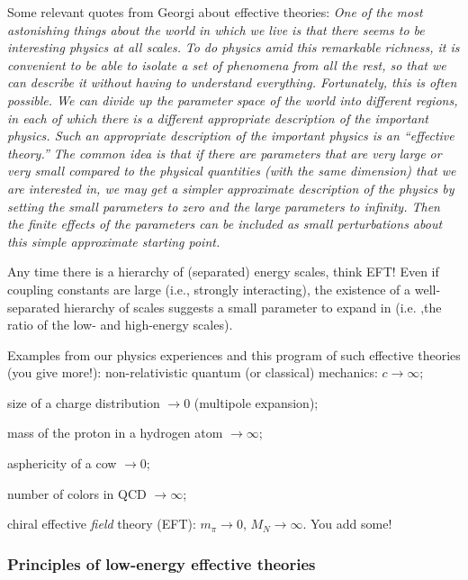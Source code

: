 Some relevant quotes from Georgi about effective theories: 
 \bi
 \I \emph{
  {\re One of the most astonishing things about the world in which we live is that there seems to be interesting physics at all scales.}}
  \I \emph{
  To do physics amid this remarkable richness, it is convenient to be able to isolate a set of phenomena from all the rest, so that we can describe it without having to understand everything.
  Fortunately, this is often possible. We can divide up the parameter space of the world into different regions, in each of which there is a different appropriate description of the important physics. {\re Such an appropriate
  description of the important physics is an ``effective theory.''}}
  \I \emph{
  The common idea is that if there are parameters that are very large or very small compared to the physical quantities (with the same dimension) that we are interested in, 
  {\re we may get a simpler approximate description of the physics by setting the small parameters to zero and the large parameters to infinity.} Then the finite effects of the parameters can be included as small perturbations about this simple approximate starting point.}  
 \ei

Any time there is a hierarchy of (separated) energy scales, think EFT!   Even if coupling constants are large (i.e., strongly interacting), the existence of a well-separated hierarchy of scales suggests a small parameter to expand in (i.e. ,the ratio of the low- and high-energy scales).


Examples from our physics experiences and this program of such effective theories (you give more!):
  \bi
 \I non-relativistic quantum (or classical) mechanics: $c\rightarrow \infty$;

 \I size of a charge distribution $\rightarrow 0$ (multipole expansion);

 \I mass of the proton in a hydrogen atom $\rightarrow \infty$;

 \I asphericity of a cow $\rightarrow 0$;

 \I number of colors in QCD $\rightarrow\infty$;

 \I  chiral effective \emph{field} theory (EFT): $m_\pi \rightarrow 0$, $M_N \rightarrow \infty$.
  \ei
\noindent
You add some!

 \subsubsection{Principles of low-energy effective theories}


